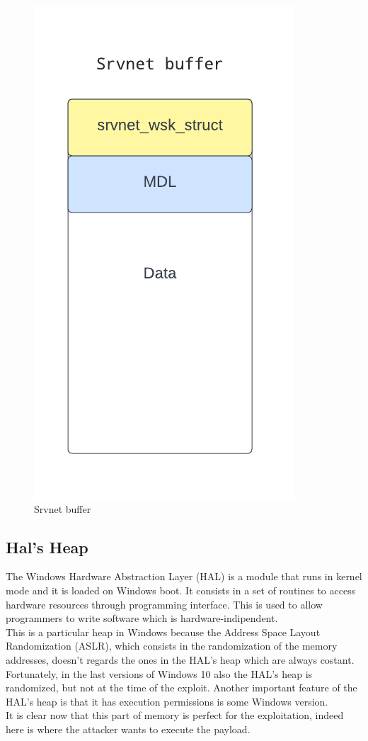 \begin{figure}[ht!]
    \centering
      \includegraphics[scale=0.7]{images/srvnet_buffer.png}
      \caption{Srvnet buffer}
\end{figure}

\clearpage

\subsection{Hal's Heap}
The Windows Hardware Abstraction Layer (HAL) is a module that runs in kernel mode and it is loaded on Windows boot. It consists in a set of routines to access hardware resources
through programming interface. This is used to allow programmers to write software which is hardware-indipendent.\\
This is a particular heap in Windows because the Address Space Layout Randomization (ASLR), which consists in the randomization of the memory addresses,
doesn't regards the ones in the HAL's heap which are always costant.
Fortunately, in the last versions of Windows 10 also the HAL's heap is randomized, but not at the time of the exploit.
Another important feature of the HAL's heap is that it has execution permissions is some Windows version.\\
It is clear now that this part of memory is perfect for the exploitation, indeed here is where the attacker wants to execute the payload.

